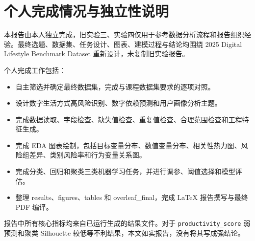 \chapter{个人完成情况与独立性说明}

本报告由本人独立完成，旧实验三、实验四仅用于参考数据分析流程和报告组织经验。最终选题、数据集、任务设计、图表、建模过程与结论均围绕 2025 Digital Lifestyle Benchmark Dataset 重新设计，未复制旧实验报告。

个人完成工作包括：

\begin{itemize}
  \item 自主筛选并确定最终数据集，完成与课程数据集要求的逐项对照。
  \item 设计数字生活方式高风险识别、数字依赖预测和用户画像分析主题。
  \item 完成数据读取、字段检查、缺失值检查、重复值检查、合理范围检查和工程特征生成。
  \item 完成 EDA 图表绘制，包括目标变量分布、数值变量分布、相关性热力图、风险组差异、类别风险率和行为变量关系图。
  \item 完成分类、回归和聚类三类机器学习任务，并进行调参、阈值选择和模型评估。
  \item 整理 results、figures、tables 和 overleaf\_final，完成 LaTeX 报告撰写与最终 PDF 编译。
\end{itemize}

报告中所有核心指标均来自已运行生成的结果文件。对于 \texttt{productivity\_score} 弱预测和聚类 Silhouette 较低等不利结果，本文如实报告，没有将其写成强结论。
